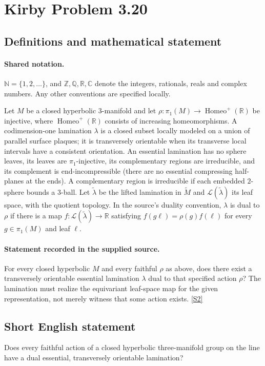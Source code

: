 \documentclass[11pt]{article}
\newcommand{\sref}[2]{\hyperlink{source:#1:#2}{[S#2]}}
\begin{document}
\section{Kirby Problem 3.20}\label{statement}

\subsection{Definitions and mathematical statement}

\paragraph{Shared notation.}$\mathbb N=\{1,2,\ldots\}$, and $\mathbb Z,\mathbb Q,\mathbb R,\mathbb C$ denote the integers, rationals, reals and complex numbers. Any other conventions are specified locally.


Let $M$ be a closed hyperbolic $3$-manifold and let $\rho:\pi_1(M)\to\operatorname{Homeo}^+(\mathbb R)$ be injective, where $\operatorname{Homeo}^+(\mathbb R)$ consists of increasing homeomorphisms. A codimension-one lamination $\lambda$ is a closed subset locally modeled on a union of parallel surface plaques; it is transversely orientable when its transverse local intervals have a consistent orientation. An essential lamination has no sphere leaves, its leaves are $\pi_1$-injective, its complementary regions are irreducible, and its complement is end-incompressible (there are no essential compressing half-planes at the ends). A complementary region is irreducible if each embedded $2$-sphere bounds a $3$-ball.
Let $\widetilde\lambda$ be the lifted lamination in $\widetilde M$ and $\mathcal L(\widetilde\lambda)$ its leaf space, with the quotient topology. In the source's duality convention, $\lambda$ is dual to $\rho$ if there is a map $f:\mathcal L(\widetilde\lambda)\to\mathbb R$ satisfying $f(g\ell)=\rho(g)f(\ell)$ for every $g\in\pi_1(M)$ and leaf $\ell$.
\paragraph{Statement recorded in the supplied source.}
For every closed hyperbolic $M$ and every faithful $\rho$ as above, does there exist a transversely orientable essential lamination $\lambda$ dual to that specified action $\rho$? The lamination must realize the equivariant leaf-space map for the given representation, not merely witness that some action exists. \sref{statement}{2}
\subsection{Short English statement}
Does every faithful action of a closed hyperbolic three-manifold group on the line have a dual essential, transversely orientable lamination?
\end{document}
